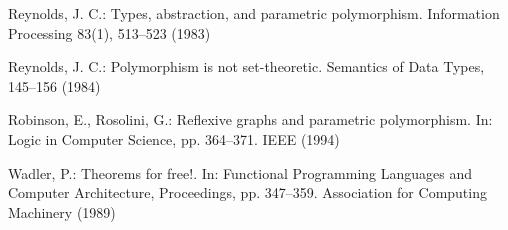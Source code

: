 \documentclass[runningheads]{llncs}
\begin{document}
\begin{thebibliography}{8}
 Reynolds, J. C.: Types, abstraction, and parametric
  polymorphism.  Information Processing 83(1), 513--523 (1983)

 Reynolds, J. C.: Polymorphism is not set-theoretic.
  Semantics of Data Types, 145--156 (1984)

 Robinson, E., Rosolini, G.: Reflexive graphs and
  parametric polymorphism.  In: Logic in Computer Science,
  pp. 364--371. IEEE (1994)

 Wadler, P.: Theorems for free!.  In: Functional
  Programming Languages and Computer Architecture, Proceedings,
  pp. 347--359. Association for Computing Machinery (1989)

\end{thebibliography}
\end{document}
